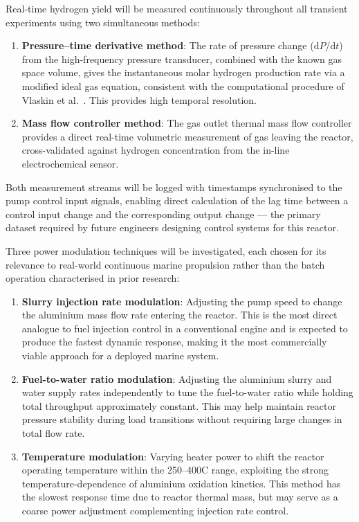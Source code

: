 \documentclass[12pt]{article}
\begin{document}
Real-time hydrogen yield will be measured continuously throughout all transient 
experiments using two simultaneous methods:

\begin{enumerate}
    \item \textbf{Pressure--time derivative method}: The rate of pressure change 
    (d$P$/d$t$) from the high-frequency pressure transducer, combined with the 
    known gas space volume, gives the instantaneous molar hydrogen production rate 
    via a modified ideal gas equation, consistent with the computational procedure 
    of Vlaskin et al.~\cite{high-temp-Al-H2O}. This provides high temporal resolution.

    \item \textbf{Mass flow controller method}: The gas outlet thermal mass flow 
    controller provides a direct real-time volumetric measurement of gas leaving the 
    reactor, cross-validated against hydrogen concentration from the in-line 
    electrochemical sensor.
\end{enumerate}

Both measurement streams will be logged with timestamps synchronised to the pump 
control input signals, enabling direct calculation of the lag time between a control 
input change and the corresponding output change --- the primary dataset required by 
future engineers designing control systems for this reactor.

Three power modulation techniques will be investigated, each chosen for its 
relevance to real-world continuous marine propulsion rather than the batch operation 
characterised in prior research:

\begin{enumerate}
    \item \textbf{Slurry injection rate modulation}: Adjusting the pump speed to 
    change the aluminium mass flow rate entering the reactor. This is the most direct 
    analogue to fuel injection control in a conventional engine and is expected to 
    produce the fastest dynamic response, making it the most commercially viable 
    approach for a deployed marine system.

    \item \textbf{Fuel-to-water ratio modulation}: Adjusting the aluminium slurry 
    and water supply rates independently to tune the fuel-to-water ratio while 
    holding total throughput approximately constant. This may help maintain reactor 
    pressure stability during load transitions without requiring large changes in 
    total flow rate.

    \item \textbf{Temperature modulation}: Varying heater power to shift the reactor 
    operating temperature within the 250--400\textdegree C range, exploiting the 
    strong temperature-dependence of aluminium oxidation kinetics. This method has 
    the slowest response time due to reactor thermal mass, but may serve as a coarse 
    power adjustment complementing injection rate control.
\end{enumerate}
\end{document}
